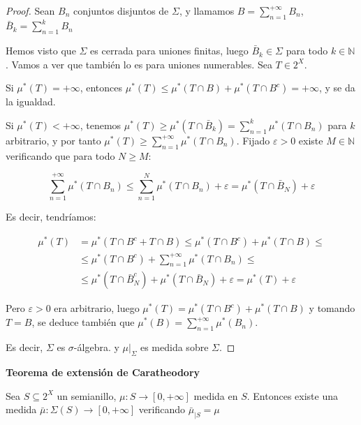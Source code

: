 \begin{proof}
 Sean $B_n$ conjuntos disjuntos de $\Sigma$, y llamamos $B = \sum_{n=1}^{+\infty} B_n$, $\bar{B}_k = \sum_{n=1}^{k} B_n$
 
 Hemos visto que $\Sigma$ es cerrada para uniones finitas, luego $\bar{B}_k \in \Sigma$ para todo $k\in \mathbb{N}$.
 Vamos a ver que también lo es para uniones numerables. Sea $T\in 2^X$.
 

 Si $\mu^\ast(T) = +\infty$, entonces $\mu^\ast(T) \le \mu^\ast(T\cap B ) + \mu^\ast(T\cap B^c) = +\infty$, y se da
 la igualdad.
 
 Si $\mu^\ast(T) < +\infty$, tenemos $\mu^\ast(T) \ge \mu^\ast(T\cap \bar{B}_k) = \sum_{n=1}^k \mu^\ast(T\cap B_n)$
 para $k$ arbitrario, y por tanto $\mu^\ast(T) \ge \sum_{n=1}^{+\infty} \mu^\ast(T\cap B_n)$. Fijado $\varepsilon > 0$
 existe $M\in \mathbb{N}$ verificando que para todo $N\ge M$:
 
 \[\sum_{n=1}^{+\infty} \mu^\ast(T\cap B_n) \le \sum_{n=1}^N \mu^\ast(T\cap B_n) + \varepsilon = 
   \mu^\ast(T\cap \bar{B}_N) + \varepsilon\]
 
 Es decir, tendríamos:
 
 \begin{align*}
  \mu^\ast(T) &=   \mu^\ast(T\cap B^c + T\cap B) \le \mu^\ast(T\cap B^c) + \mu^\ast(T\cap B) \le \\
              &\le \mu^\ast(T\cap B^c) + \sum_{n=1}^{+\infty}\mu^\ast(T\cap B_n) \le \\
              &\le \mu^\ast(T\cap \bar{B}_N^c) + \mu^\ast(T\cap \bar{B}_N) + \varepsilon
                =  \mu^\ast(T) + \varepsilon
 \end{align*}

 Pero $\varepsilon > 0$ era arbitrario, luego $\mu^\ast(T) = \mu^\ast(T\cap B^c) + \mu^\ast(T\cap B)$ y tomando 
 $T=B$, se deduce también que $\mu^\ast(B) = \sum_{n=1}^{+\infty}\mu^\ast(B_n)$.
 
 Es decir, $\Sigma$ es $\sigma$-álgebra. y $\mu|_{\Sigma}$ es medida sobre $\Sigma$.
 
\end{proof}


\begin{theorem} \textbf{Teorema de extensión de Caratheodory}

 Sea $S \subseteq 2^X$ un semianillo, $\mu:S \rightarrow [0,+\infty]$ medida en $S$. Entonces existe
 una medida $\bar{\mu}:\Sigma(S) \rightarrow [0,+\infty]$ verificando $\bar{\mu}_{|S} = \mu$
 
 \label{th:caratheodory}
\end{theorem}

